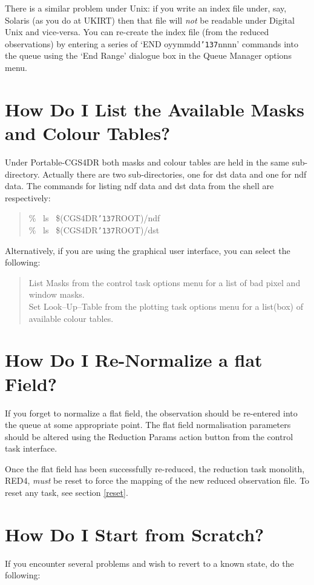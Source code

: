 \documentclass[a4paper]{book}
\renewcommand{\_}{{\tt\char'137}}
\begin{document}
There is a similar problem under Unix: if you write an index file under, say, Solaris (as you do at UKIRT) then that file will
{\em not} be readable under Digital Unix and vice-versa. You can re-create the index file (from the reduced observations)
by entering a series of `END oyymmdd\_nnnn' commands into the queue using the `End Range' dialogue box in the Queue
Manager options menu.

\section{How Do I List the Available Masks and Colour Tables?}
Under Portable-CGS4DR both masks and colour tables are held in the same sub-directory.
Actually there are two sub-directories, one for {\sc dst} data and one for {\sc ndf} data.
The commands for listing {\sc ndf} data and {\sc dst} data from the shell are respectively:

\begin{quote}
 \% \ ls \ \$(CGS4DR\_ROOT)/ndf \\
 \% \ ls \ \$(CGS4DR\_ROOT)/dst
\end{quote}

Alternatively, if you are using the graphical user interface, you can select the following:

\begin{quote}
 {\sf List Masks} from the control task options menu for a list of bad pixel and window masks.\\
 {\sf Set Look--Up--Table} from the plotting task options menu for a list(box) of available colour tables.
\end{quote}

\section{How Do I Re-Normalize a {\sc flat} Field?}
If you forget to normalize a {\sc flat} field, the observation should be re-entered into the
queue at some appropriate point. The {\sc flat} field normalisation parameters should be
altered using the {\sf Reduction Params} action button from the control task interface.

Once the {\sc flat} field has been successfully re-reduced, the reduction task monolith,
RED4, {\em must} be reset to force the mapping of the new reduced observation file. To reset
any task, see section \ref{reset}.

\section{How Do I Start from Scratch?}
\label{restart}
If you encounter several problems and wish to revert to a known state, do the following:
\end{document}
